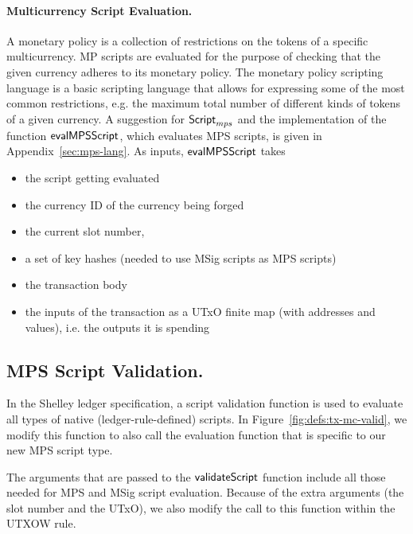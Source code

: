 \paragraph*{Multicurrency Script Evaluation.}
A monetary policy is a collection of restrictions on the tokens of a
specific multicurrency. MP scripts are evaluated for the purpose of checking that
the given currency adheres to its monetary policy. The monetary policy scripting
language is a basic scripting language that
allows for expressing some of the most common restrictions, e.g.
the maximum total number of different kinds of tokens of a given currency.
A suggestion for $\mathsf{Script}_{mps}$ and the implementation of the function
$\mathsf{evalMPSScript}$, which evaluates MPS scripts, is given in
Appendix~\ref{sec:mps-lang}. As inputs, $\mathsf{evalMPSScript}$ takes

\begin{itemize}
\item the script getting evaluated
\item the currency ID of the currency being forged
\item the current slot number,
\item a set of key hashes (needed to use MSig scripts as MPS scripts)
\item the transaction body
\item the inputs of the transaction as a UTxO finite map (with addresses and values),
i.e. the outputs it is spending
\end{itemize}


\subsection*{MPS Script Validation.}

In the Shelley ledger specification, a script validation function
is used to evaluate all types of native (ledger-rule-defined) scripts.
In Figure~\ref{fig:defs:tx-mc-valid}, we modify this function to also call the
evaluation function that is specific to our new MPS script type.

The arguments that are passed to the $\mathsf{validateScript}$ function include all those
needed for MPS and MSig script evaluation. Because of the extra arguments
(the slot number and the UTxO), we also modify the call to this function
within the UTXOW rule.

